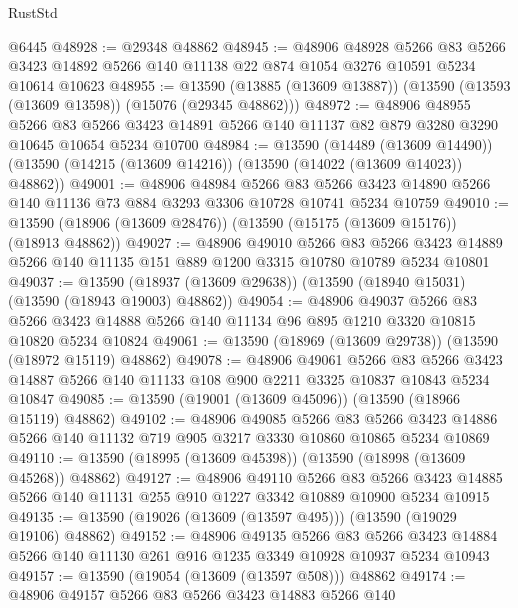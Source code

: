 \begin{lexlean}{RustStd}
\begin{coremodule}
    @6445
@48928 := @29348 @48862
@48945 := @48906
    @48928
    @5266
    @83
    @5266
    @3423
    @14892
    @5266
    @140
    @11138
    @22
    @874
    @1054
    @3276
    @10591
    @5234
    @10614
    @10623
@48955 := @13590 (@13885 (@13609 @13887)) (@13590 (@13593 (@13609 @13598)) (@15076 (@29345 @48862)))
@48972 := @48906
    @48955
    @5266
    @83
    @5266
    @3423
    @14891
    @5266
    @140
    @11137
    @82
    @879
    @3280
    @3290
    @10645
    @10654
    @5234
    @10700
@48984 := @13590
    (@14489 (@13609 @14490))
    (@13590 (@14215 (@13609 @14216)) (@13590 (@14022 (@13609 @14023)) @48862))
@49001 := @48906
    @48984
    @5266
    @83
    @5266
    @3423
    @14890
    @5266
    @140
    @11136
    @73
    @884
    @3293
    @3306
    @10728
    @10741
    @5234
    @10759
@49010 := @13590 (@18906 (@13609 @28476)) (@13590 (@15175 (@13609 @15176)) (@18913 @48862))
@49027 := @48906
    @49010
    @5266
    @83
    @5266
    @3423
    @14889
    @5266
    @140
    @11135
    @151
    @889
    @1200
    @3315
    @10780
    @10789
    @5234
    @10801
@49037 := @13590 (@18937 (@13609 @29638)) (@13590 (@18940 @15031) (@13590 (@18943 @19003) @48862))
@49054 := @48906
    @49037
    @5266
    @83
    @5266
    @3423
    @14888
    @5266
    @140
    @11134
    @96
    @895
    @1210
    @3320
    @10815
    @10820
    @5234
    @10824
@49061 := @13590 (@18969 (@13609 @29738)) (@13590 (@18972 @15119) @48862)
@49078 := @48906
    @49061
    @5266
    @83
    @5266
    @3423
    @14887
    @5266
    @140
    @11133
    @108
    @900
    @2211
    @3325
    @10837
    @10843
    @5234
    @10847
@49085 := @13590 (@19001 (@13609 @45096)) (@13590 (@18966 @15119) @48862)
@49102 := @48906
    @49085
    @5266
    @83
    @5266
    @3423
    @14886
    @5266
    @140
    @11132
    @719
    @905
    @3217
    @3330
    @10860
    @10865
    @5234
    @10869
@49110 := @13590 (@18995 (@13609 @45398)) (@13590 (@18998 (@13609 @45268)) @48862)
@49127 := @48906
    @49110
    @5266
    @83
    @5266
    @3423
    @14885
    @5266
    @140
    @11131
    @255
    @910
    @1227
    @3342
    @10889
    @10900
    @5234
    @10915
@49135 := @13590 (@19026 (@13609 (@13597 @495))) (@13590 (@19029 @19106) @48862)
@49152 := @48906
    @49135
    @5266
    @83
    @5266
    @3423
    @14884
    @5266
    @140
    @11130
    @261
    @916
    @1235
    @3349
    @10928
    @10937
    @5234
    @10943
@49157 := @13590 (@19054 (@13609 (@13597 @508))) @48862
@49174 := @48906
    @49157
    @5266
    @83
    @5266
    @3423
    @14883
    @5266
    @140

\end{coremodule}
\end{lexlean}
